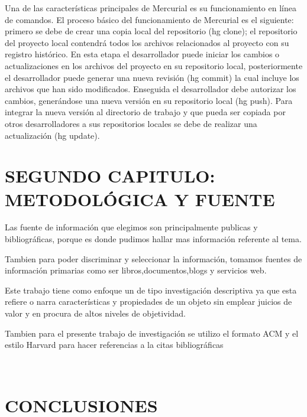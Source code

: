 \documentclass[a4paper,12pt]{article}
\begin{document}
{\begin{itemize}
	Una de las características principales de Mercurial es su funcionamiento en línea de comandos. El proceso básico del funcionamiento de Mercurial es el siguiente: primero se debe de crear una copia local del repositorio (hg clone); el repositorio del proyecto local contendrá todos los archivos relacionados al proyecto con su registro histórico. En esta etapa el desarrollador puede iniciar los cambios o actualizaciones en los archivos del proyecto en su repositorio local, posteriormente el desarrollador puede generar una nueva revisión (hg commit) la cual incluye los archivos que han sido modificados. Enseguida el desarrollador debe autorizar los cambios, generándose una nueva versión en su repositorio local (hg push). Para integrar la nueva versión al directorio de trabajo y que pueda ser copiada por otros desarrolladores a sus repositorios locales se debe de realizar una actualización (hg update).
	
\end{itemize}

\section{SEGUNDO CAPITULO: METODOLÓGICA Y FUENTE}



Las fuente de información que elegimos son principalmente publicas y bibliográficas, porque es donde pudimos hallar mas información referente al tema.

Tambien para poder discriminar y seleccionar la información, tomamos fuentes de información primarias como ser libros,documentos,blogs y servicios web. 

Este trabajo tiene como enfoque un de tipo investigación descriptiva ya que esta refiere o narra características y propiedades de un objeto sin emplear juicios de valor y en procura de altos niveles de objetividad.

Tambien para el presente trabajo de investigación se utilizo el formato ACM y el estilo Harvard para hacer referencias a la citas bibliográficas


\ 
\section{CONCLUSIONES}

}
\end{document}
